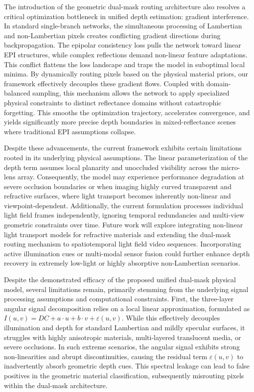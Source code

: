 The introduction of the geometric dual-mask routing architecture also resolves a critical optimization bottleneck in unified depth estimation: gradient interference. In standard single-branch networks, the simultaneous processing of Lambertian and non-Lambertian pixels creates conflicting gradient directions during backpropagation. The epipolar consistency loss pulls the network toward linear EPI structures, while complex reflections demand non-linear feature adaptations. This conflict flattens the loss landscape and traps the model in suboptimal local minima. By dynamically routing pixels based on the physical material priors, our framework effectively decouples these gradient flows. Coupled with domain-balanced sampling, this mechanism allows the network to apply specialized physical constraints to distinct reflectance domains without catastrophic forgetting. This smooths the optimization trajectory, accelerates convergence, and yields significantly more precise depth boundaries in mixed-reflectance scenes where traditional EPI assumptions collapse.

Despite these advancements, the current framework exhibits certain limitations rooted in its underlying physical assumptions. The linear parameterization of the depth term assumes local planarity and unoccluded visibility across the micro-lens array. Consequently, the model may experience performance degradation at severe occlusion boundaries or when imaging highly curved transparent and refractive surfaces, where light transport becomes inherently non-linear and viewpoint-dependent. Additionally, the current formulation processes individual light field frames independently, ignoring temporal redundancies and multi-view geometric constraints over time. Future work will explore integrating non-linear light transport models for refractive materials and extending the dual-mask routing mechanism to spatiotemporal light field video sequences. Incorporating active illumination cues or multi-modal sensor fusion could further enhance depth recovery in extremely low-light or highly absorptive non-Lambertian scenarios.

Despite the demonstrated efficacy of the proposed unified dual-mask physical model, several limitations remain, primarily stemming from the underlying signal processing assumptions and computational constraints. First, the three-layer angular signal decomposition relies on a local linear approximation, formulated as $I(u,v) = DC + a\cdot u + b\cdot v + \varepsilon(u,v)$. While this effectively decouples illumination and depth for standard Lambertian and mildly specular surfaces, it struggles with highly anisotropic materials, multi-layered translucent media, or severe occlusions. In such extreme scenarios, the angular signal exhibits strong non-linearities and abrupt discontinuities, causing the residual term $\varepsilon(u,v)$ to inadvertently absorb geometric depth cues. This spectral leakage can lead to false positives in the geometric material classification, subsequently misrouting pixels within the dual-mask architecture.

